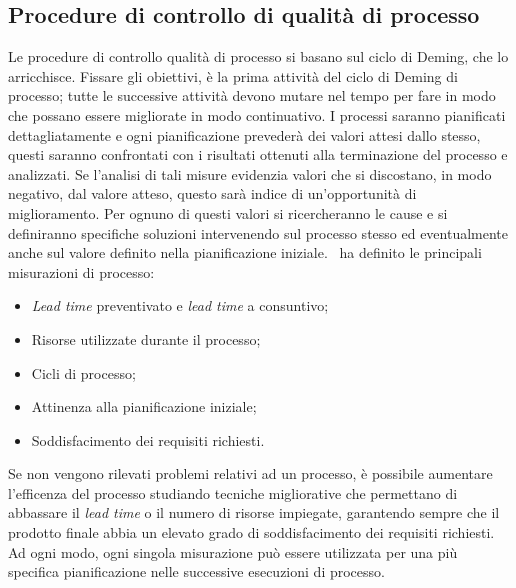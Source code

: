 \subsection{Procedure di controllo di qualità di processo}
Le procedure di controllo qualità di processo si basano sul ciclo di Deming, che lo arricchisce. Fissare gli obiettivi, è la prima attività del ciclo di Deming di processo; tutte le successive attività devono mutare nel tempo per fare in modo che possano essere migliorate in modo continuativo. I processi saranno pianificati dettagliatamente e ogni pianificazione prevederà dei valori attesi dallo stesso, questi saranno confrontati con i risultati ottenuti alla terminazione del processo e analizzati. Se l'analisi di tali misure evidenzia valori che si discostano, in modo negativo, dal valore atteso, questo sarà indice di un'opportunità di miglioramento. Per ognuno di questi valori si ricercheranno le cause e si definiranno specifiche soluzioni intervenendo sul processo stesso ed eventualmente anche sul valore definito nella pianificazione iniziale.
\gruppo ~ha definito le principali misurazioni di processo:
\begin{itemize}
\item \textit{Lead time} preventivato e \textit{lead time} a consuntivo;
\item Risorse utilizzate durante il processo;
\item Cicli di processo;
\item Attinenza alla pianificazione iniziale;
\item Soddisfacimento dei requisiti richiesti.
\end{itemize}
Se non vengono rilevati problemi relativi ad un processo, è possibile aumentare l'efficenza del processo studiando tecniche migliorative che permettano di abbassare il \textit{lead time} o il numero di risorse impiegate, garantendo sempre che il prodotto finale abbia un elevato grado di soddisfacimento dei requisiti richiesti. Ad ogni modo, ogni singola misurazione può essere utilizzata per una più specifica pianificazione nelle successive esecuzioni di processo.
